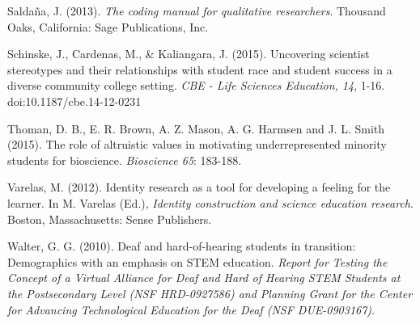 \documentclass[11.5pt]{sig-alternate} %
\begin{document}
Saldaña, J. (2013). \textit{The coding manual for qualitative researchers}. Thousand Oaks, California: Sage Publications, Inc.

Schinske, J., Cardenas, M., \& Kaliangara, J. (2015). Uncovering scientist stereotypes and their relationships with student race and student success in a diverse community college setting. \textit{CBE - Life Sciences Education, 14}, 1-16. doi:10.1187/cbe.14-12-0231

Thoman, D. B., E. R. Brown, A. Z. Mason, A. G. Harmsen and J. L. Smith (2015). The role of altruistic values in motivating underrepresented minority students for bioscience. \textit{Bioscience 65}: 183-188.

Varelas, M. (2012). Identity research as a tool for developing a feeling for the learner. In M. Varelas (Ed.), \textit{Identity construction and science education research}. Boston, Massachusetts: Sense Publishers.

Walter, G. G. (2010). Deaf and hard-of-hearing students in transition: Demographics with an emphasis on STEM education. \textit{Report for Testing the Concept of a Virtual Alliance for Deaf and Hard of Hearing STEM Students at the Postsecondary Level (NSF HRD-0927586) and Planning Grant for the Center for Advancing Technological Education for the Deaf (NSF DUE-0903167)}. 
\end{document}
